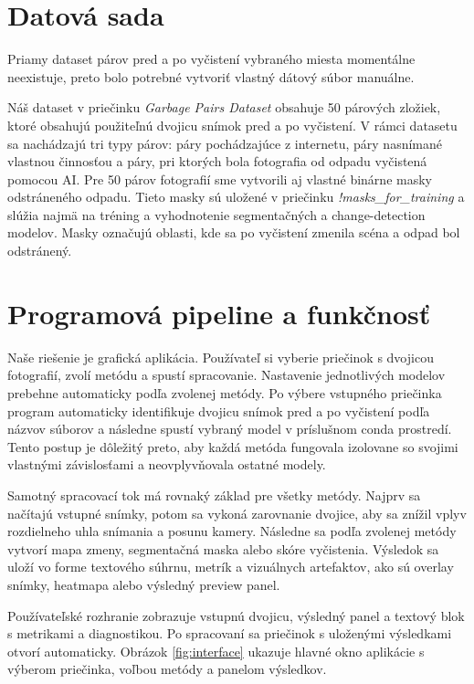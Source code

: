 \documentclass[conference]{IEEEtran}
\begin{document}
\section{Datová sada}
Priamy dataset párov pred a po vyčistení vybraného miesta momentálne neexistuje, preto bolo potrebné vytvoriť vlastný dátový súbor manuálne.

Náš dataset v priečinku \textit{Garbage Pairs Dataset} obsahuje 50 párových zložiek, ktoré obsahujú použiteľnú dvojicu snímok pred a po vyčistení. 
V rámci datasetu sa nachádzajú tri typy párov: páry pochádzajúce z internetu, páry nasnímané vlastnou činnosťou a páry, pri ktorých bola fotografia od odpadu vyčistená pomocou AI.
Pre 50 párov fotografií sme vytvorili aj vlastné binárne masky odstráneného odpadu. Tieto masky sú uložené v priečinku \textit{!masks\_for\_training} a slúžia najmä na tréning a vyhodnotenie segmentačných a change-detection modelov. Masky označujú oblasti, kde sa po vyčistení zmenila scéna a odpad bol odstránený.

\section{Programová pipeline a funkčnosť}
Naše riešenie je grafická aplikácia. Používateľ si vyberie priečinok s dvojicou fotografií, zvolí metódu a spustí spracovanie. Nastavenie jednotlivých modelov prebehne automaticky podľa zvolenej metódy. Po výbere vstupného priečinka program automaticky identifikuje dvojicu snímok pred a po vyčistení podľa názvov súborov a následne spustí vybraný model v príslušnom conda prostredí. Tento postup je dôležitý preto, aby každá metóda fungovala izolovane so svojimi vlastnými závislosťami a neovplyvňovala ostatné modely.

Samotný spracovací tok má rovnaký základ pre všetky metódy. Najprv sa načítajú vstupné snímky, potom sa vykoná zarovnanie dvojice, aby sa znížil vplyv rozdielneho uhla snímania a posunu kamery. Následne sa podľa zvolenej metódy vytvorí mapa zmeny, segmentačná maska alebo skóre vyčistenia. Výsledok sa uloží vo forme textového súhrnu, metrík a vizuálnych artefaktov, ako sú overlay snímky, heatmapa alebo výsledný preview panel.

Používateľské rozhranie zobrazuje vstupnú dvojicu, výsledný panel a textový blok s metrikami a diagnostikou. Po spracovaní sa priečinok s uloženými výsledkami otvorí automaticky. Obrázok \ref{fig:interface} ukazuje hlavné okno aplikácie s výberom priečinka, voľbou metódy a panelom výsledkov.
\end{document}
